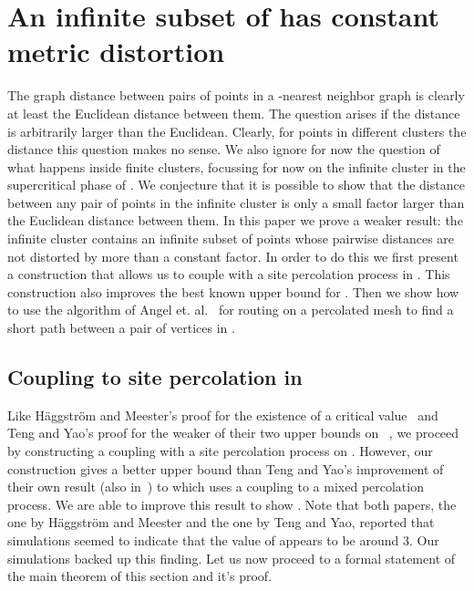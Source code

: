 \documentclass[11pt]{article}
\begin{document}
\section{An infinite subset of  has constant metric
  distortion} 
\label{sec:metric}

The graph distance between pairs of points in a -nearest neighbor
graph is clearly at least the Euclidean distance between them. The
question arises if the distance is arbitrarily larger than the
Euclidean. Clearly, for points in different clusters the distance this
question makes no sense. We also ignore for now the question of what
happens inside finite clusters, focussing for now on the infinite
cluster in the supercritical phase of . We conjecture that
it is possible to show that the distance between any pair of points in
the infinite cluster is only a small factor larger than the Euclidean
distance between them. In this paper we prove a weaker result: the
infinite cluster contains an infinite subset of points whose pairwise
distances are not distorted by more than a constant factor. In order
to do this we first present a construction that allows us to couple
 with a site percolation process in . This
construction also improves the best known upper bound for
. Then we show how to use the algorithm of Angel
et. al.~\cite{angel-podc:2005} for routing on a percolated mesh to
find a short path between a pair of vertices in .

\subsection{Coupling  to site percolation in }
\label{sec:metric:2d-bounds}

Like H\"aggstr\"om and Meester's proof for the existence of a critical
value~\cite{haggstrom-rsa:1996} and Teng and Yao's proof for the
weaker of their two upper bounds on
~\cite{teng-algorithmica:2007}, we proceed by constructing a
coupling with a site percolation process on . However, our
construction gives a better upper bound than Teng and Yao's
improvement of their own result (also
in~\cite{teng-algorithmica:2007}) to  which uses a
coupling to a mixed percolation process. We are able to improve this
result to show . Note that both papers, the one by
H\"aggstr\"om and Meester and the one by Teng and Yao, reported that
simulations seemed to indicate that the value of  appears to
be around 3. Our simulations backed up this finding. Let us now
proceed to a formal statement of the main theorem of this section and
it's proof.
\end{document}
